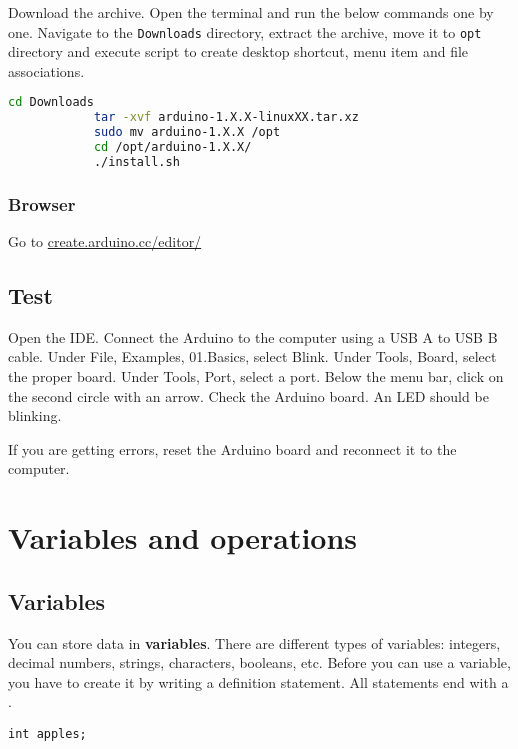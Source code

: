 \documentclass{article}
\begin{document}
			Download the  archive. Open the terminal and run the below commands one by one\@. Navigate to the \texttt{Downloads} directory, extract the archive, move it to \texttt{opt} directory and execute script to create desktop shortcut, menu item and file associations.

			\begin{lstlisting}[gobble=12, language=bash]
			cd Downloads
			tar -xvf arduino-1.X.X-linuxXX.tar.xz
			sudo mv arduino-1.X.X /opt
			cd /opt/arduino-1.X.X/
			./install.sh
			\end{lstlisting}

		\subsubsection{Browser}
			Go to \url{create.arduino.cc/editor/}

	\subsection{Test}

		Open the IDE\@. Connect the Arduino to the computer using a USB A to USB B cable. Under File, Examples, 01.Basics, select Blink. Under Tools, Board, select the proper board. Under Tools, Port, select a port. Below the menu bar, click on the second circle with an arrow. Check the Arduino board. An LED should be blinking.

		If you are getting errors, reset the Arduino board and reconnect it to the computer.

\section{Variables and operations}

	\subsection{Variables}

		You can store data in \textbf{variables}. There are different types of variables: integers, decimal numbers, strings, characters, booleans, etc. Before you can use a variable, you have to create it by writing a definition statement. All statements end with a \inlncd{;}.

		\begin{lstlisting}[gobble=8]
		int apples;
		\end{lstlisting}
\end{document}
